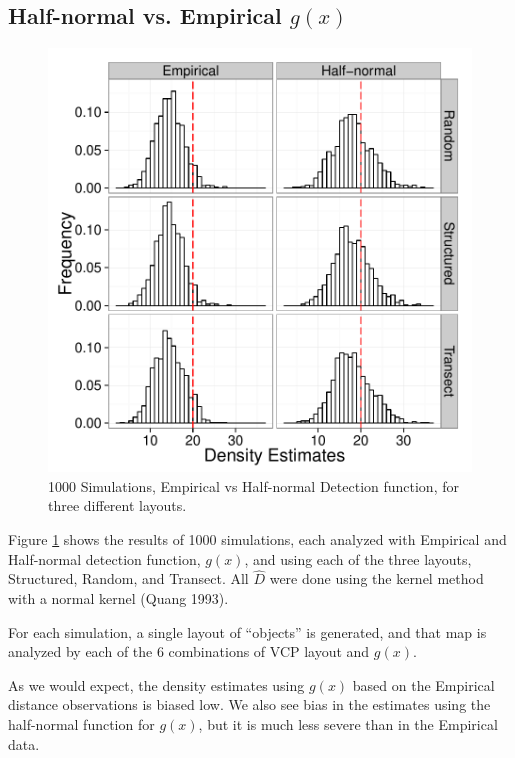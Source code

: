 \documentclass[12pt]{article}
\begin{document}
\subsection{Half-normal vs. Empirical $g(x)$}
\begin{figure}

	\includegraphics[width=\textwidth]{../images/Emp_Vs_Hnorm.pdf}
	\caption{1000 Simulations, Empirical vs Half-normal Detection function, for three different layouts. \label{fig:sim1}}
		
\end{figure}
Figure \ref{fig:sim1} shows the results of 1000 simulations, each analyzed with Empirical and Half-normal detection function, $g(x)$, and using each of the three layouts, Structured, Random, and Transect. All $\hat{D}$  were done using the kernel method with a normal kernel (Quang 1993).

For each simulation, a single layout of ``objects'' is generated, and that map is analyzed by each of the 6 combinations of VCP layout and $g(x)$. 

As we would expect, the density estimates using $g(x)$ based on the Empirical distance observations is biased low. We also see bias in the estimates using the half-normal function for $g(x)$, but it is much less severe than in the Empirical data.
\end{document}
